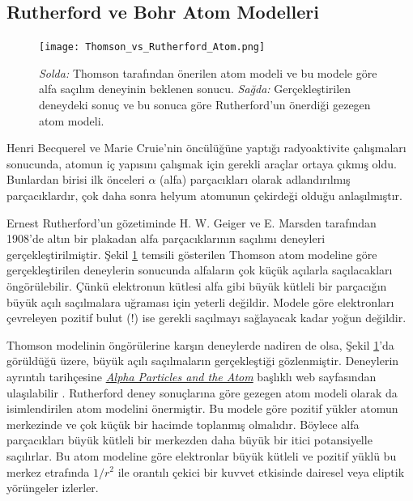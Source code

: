 \documentclass[a4paper,12pt, twoside]{article}
\begin{document}
\newpage

\subsection{Rutherford ve Bohr Atom Modelleri}

\begin{figure}[hbtp]
\center
\texttt{[image: Thomson\_vs\_Rutherford\_Atom.png]}
\caption{ {\it Solda:} Thomson tarafından önerilen atom modeli ve bu modele göre alfa saçılım deneyinin beklenen sonucu. {\it Sağda:} Gerçekleştirilen deneydeki sonuç ve bu sonuca göre Rutherford'un önerdiği gezegen atom modeli. }
\label{fig:rutherfod_bohr_atom}
\end{figure}

Henri Becquerel ve Marie Cruie'nin öncülüğüne yaptığı radyoaktivite çalışmaları sonucunda, atomun iç yapısını çalışmak için gerekli araçlar ortaya çıkmış oldu. Bunlardan birisi ilk önceleri $\alpha$ (alfa) parçacıkları olarak adlandırılmış parçacıklardır, çok daha sonra helyum atomunun çekirdeği olduğu anlaşılmıştır. 

Ernest Rutherford'un gözetiminde H. W. Geiger  ve E. Marsden tarafından 1908'de altın bir plakadan alfa parçacıklarının saçılımı deneyleri gerçekleştirilmiştir. Şekil \ref{fig:rutherfod_bohr_atom} temsili gösterilen Thomson atom modeline göre gerçekleştirilen deneylerin sonucunda alfaların çok küçük açılarla saçılacakları öngörülebilir. Çünkü elektronun kütlesi alfa gibi büyük kütleli bir parçacığın büyük açılı saçılmalara uğraması için yeterli değildir. Modele göre elektronları çevreleyen pozitif bulut (!) ise gerekli saçılmayı sağlayacak kadar yoğun değildir.

Thomson modelinin öngörülerine karşın deneylerde nadiren de olsa, Şekil \ref{fig:rutherfod_bohr_atom}'da görüldüğü üzere, büyük açılı saçılmaların gerçekleştiği gözlenmiştir. Deneylerin ayrıntılı tarihçesine {\it \href{https://history.aip.org/exhibits/rutherford/sections/alpha-particles-atom.html}{Alpha Particles and the Atom}} başlıklı web sayfasından ulaşılabilir \cite{web:rutherford_bohr_atom}. Rutherford deney sonuçlarına göre gezegen atom modeli olarak da isimlendirilen atom modelini önermiştir. Bu modele göre pozitif yükler atomun merkezinde ve çok küçük bir hacimde toplanmış olmalıdır. Böylece alfa parçacıkları büyük kütleli bir merkezden daha büyük bir itici potansiyelle saçılırlar. Bu atom modeline göre elektronlar büyük kütleli ve pozitif yüklü bu merkez etrafında $1/r^2$ ile orantılı çekici bir kuvvet etkisinde dairesel veya eliptik yörüngeler izlerler.
\end{document}
